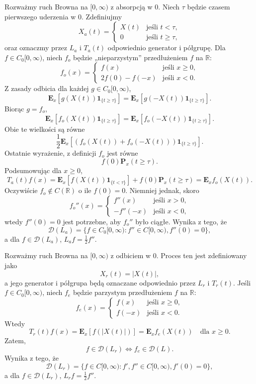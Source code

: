 \documentclass{article}
\begin{document}
	\begin{pd}
		Rozważmy ruch Browna na $[0, \infty)$ z absorpcją w 0. 
		Niech $\tau$ będzie czasem pierwszego uderzenia w 0. Zdefiniujmy
		\[
			X_a(t) = 
\begin{cases}
X(t) & \text{jeśli } t < \tau, \\
0 & \text{jeśli } t \ge \tau,
\end{cases}
\]
oraz oznaczmy przez $L_a$ i $T_a(t)$ odpowiednio generator i półgrupę. 
Dla $f \in C_0[0, \infty)$, niech $f_o$ będzie „nieparzystym” przedłużeniem $f$ na $\mathbb{R}$:
\[
f_o(x) = 
\begin{cases}
f(x) & \text{jeśli } x \ge 0, \\
2f(0) - f(-x) & \text{jeśli } x < 0.
\end{cases}
\]
Z zasady odbicia dla każdej $g \in C_0[0,\infty)$,
\[
	\mathbf{E}_x \left[g(X(t)) \mathbf{1}_{\{ t \ge \tau \}} \right] = 
	\mathbf{E}_x \left[g(-X(t)) \mathbf{1}_{\{ t \ge \tau \}} \right].
\]
Biorąc $g=f_o$,
\[
	\mathbf{E}_x \left[f_o(X(t)) \mathbf{1}_{\{ t \ge \tau \}} \right] 
	= \mathbf{E}_x \left[f_o(-X(t)) \mathbf{1}_{\{ t \ge \tau \}} \right].
\]
Obie te wielkości są równe
\[
	\frac{1}{2} \mathbf{E}_x \left[(f_o(X(t)) + f_o(-X(t)) ) \mathbf{1}_{\{ t \ge \tau \}} \right].
\]
Ostatnie wyrażenie, z definicji $f_o$ jest równe 
\[
f(0)\mathbf{P}_x(t \ge \tau).
\]
Podsumowując dla $x \ge 0$,
\[
	T_a(t)f(x) = \mathbf{E}_x \left[f(X(t)) \mathbf{1}_{\{ t < \tau \}} \right] + 
	f(0)\mathbf{P}_x(t \ge \tau) = \mathbf{E}_x f_o(X(t)).
\]
Oczywiście $f_o \notin C(\mathbb{R})$ o ile $f(0) = 0$. Niemniej jednak, skoro
\[
f_o''(x) = 
\begin{cases}
f''(x) & \text{jeśli } x > 0, \\
-f''(-x) & \text{jeśli } x < 0,
\end{cases}
\]
wtedy $f''(0) = 0$ jest potrzebne, aby $f_o''$ było ciągłe. Wynika z tego, że
\[
\mathcal{D}(L_a) = \{f \in C_0[0, \infty) :  f'' \in C[0, \infty), f''(0) = 0\},
\]
a dla $f \in \mathcal{D}(L_a)$, $L_a f = \frac{1}{2} f''$.
\end{pd}

\begin{pd}
Rozważmy ruch Browna na $[0, \infty)$ z odbiciem w $0$. 
Proces ten jest zdefiniowany jako
\[
X_r(t) = |X(t)|,
\]
a jego generator i półgrupa będą oznaczane odpowiednio przez 
$L_r$ i $T_r(t)$. Jeśli $f \in C_0[0, \infty)$, 
niech $f_e$ będzie parzystym przedłużeniem $f$ na $\mathbb{R}$:
\[
f_e(x) = 
\begin{cases}
f(x) & \text{jeśli } x \ge 0, \\
f(-x) & \text{jeśli } x < 0.
\end{cases}
\]
Wtedy
\[
T_r(t)f(x) = \mathbf{E}_x \left[f(|X(t)|)\right] = \mathbf{E}_x f_e(X(t)) \quad \text{dla } x \ge 0.
\]
Zatem,
\[
f \in \mathcal{D}( L_r) \iff f_e \in \mathcal{D}(L).
\]
Wynika z tego, że
\[
\mathcal{D}(L_r) = \{f \in C[0, \infty) : f', f'' \in C[0, \infty), f'(0) = 0\},
\]
a dla $f \in \mathcal{D}(L_r)$, $L_r f = \frac{1}{2} f''$.
\end{pd}
\end{document}
